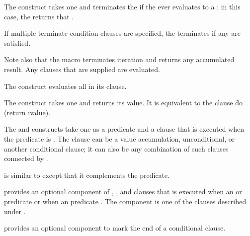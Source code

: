 \itemitem{--}  
  The  construct takes one  and
  terminates the  if the  ever evaluates to
  a  ;
  in this case, the   returns that .
\endlist 

If multiple terminate condition clauses are specified, the 
 terminates if any are satisfied.

Note also that the  macro terminates iteration and returns any
accumulated result.  Any  clauses that are supplied are evaluated.
 
\endsubsubsubsection%

 
\beginlist

\itemitem{--}  
  The  construct evaluates all  in its clause.
 
\itemitem{--}  
  The  construct takes one  and returns its value.
  It is equivalent to the clause \f{do (return \i{value})}.
\endlist
 
\endsubsubsubsection%


\beginlist 
\itemitem{--}  
  The  and  constructs take one  as a predicate 
  and a clause that is executed when the predicate is .
  The clause can be a value accumulation, unconditional, or 
  another conditional clause; it can also be any combination
  of such clauses connected by .
 
\itemitem{--}  
   is similar to 
  except that it complements the predicate.
 
\itemitem{--}  
   provides an optional component of ,
  , and  clauses that is executed 
       when an  or  predicate  
    or when an  predicate  .
  The component is one of the clauses described under .

\itemitem{--}  
   provides an optional component to mark the
  end of a conditional clause.
\endlist
 
